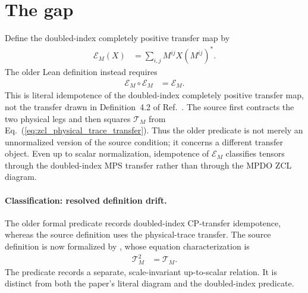 \documentclass{article}
\begin{document}
\section{The gap}

Define the doubled-index completely positive transfer map by
\begin{align}
    \mathcal E_M(X)
    &=\sum_{i,j}M^{ij}X(M^{ij})^\ast.
    \label{eq:zcl_doubled_transfer_definition}
\end{align}
The older Lean definition  instead requires
\begin{align}
    \mathcal E_M\circ\mathcal E_M
    &=\mathcal E_M.
    \label{eq:zcl_doubled_transfer_idempotence}
\end{align}
This is literal idempotence of the doubled-index completely positive transfer
map, not the transfer drawn in Definition~4.2 of
Ref.~\cite{Cirac2016MPDO_arXiv}. The source first contracts the two physical
legs and then squares $\mathcal T_M$ from
Eq.~(\ref{eq:zcl_physical_trace_transfer}). Thus the older predicate is not
merely an unnormalized version of the source condition; it concerns a
different transfer object. Even up to scalar normalization, idempotence of
$\mathcal E_M$ classifies tensors through the doubled-index MPS transfer rather
than through the MPDO ZCL diagram.

\paragraph{Classification: resolved definition drift.}
The older formal predicate records doubled-index CP-transfer idempotence,
whereas the source definition uses the physical-trace transfer. The source
definition is now formalized by
, whose equation characterization
is
\begin{align}
    \mathcal T_M^2
    &=\mathcal T_M.
    \label{eq:zcl_literal_physical_idempotence}
\end{align}
The predicate  records a separate,
scale-invariant up-to-scalar relation. It is distinct from both the paper's
literal diagram and the doubled-index predicate.
\end{document}
